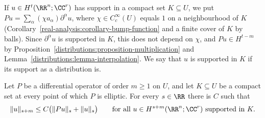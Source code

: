 \begin{notation}\label{distributions:notation-pu}
If $u \in H^t(\RR^n; \CC^r)$ has support in a compact set $K \subseteq U$, we put $Pu = \sum_\alpha(\chi a_\alpha)\partial^\alpha u$, where $\chi \in C_c^\infty(U)$ equals $1$ on a neighbourhood of $K$
(Corollary~\ref{real-analysis:corollary-bump-function} and a finite cover of $K$ by balls). Since $\partial^\alpha u$ is supported in $K$, this does not depend on $\chi$, and $Pu \in H^{t-m}$ by
Proposition~\ref{distributions:proposition-multiplication} and Lemma~\ref{distributions:lemma-interpolation}. We say that $u$ is supported in $K$ if its support as a distribution is.
\end{notation}

\begin{theorem}\label{distributions:theorem-local-estimate}
Let $P$ be a differential operator of order $m \geq 1$ on $U$, and let $K \subseteq U$ be a compact set at every point of which $P$ is elliptic. For every $s \in \RR$ there is $C$ such that
\[
\|u\|_{s+m} \leq C\bigl(\|Pu\|_s + \|u\|_s\bigr) \qquad \text{for all } u \in H^{s+m}(\RR^n; \CC^r) \text{ supported in } K.
\]
\end{theorem}


